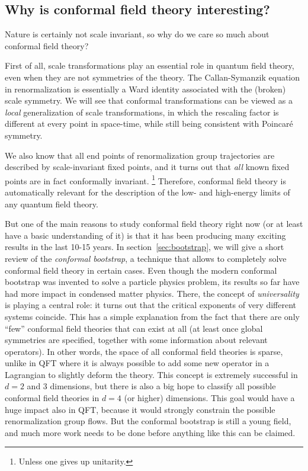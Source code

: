 \documentclass[a4paper,12pt]{article}
\numberwithin{equation}{section}
\begin{document}
\subsection{Why is conformal field theory interesting?}

Nature is certainly not scale invariant, so why do we care so much about conformal field theory?

First of all, scale transformations play an essential role in quantum field theory, even when they are not symmetries of the theory. The Callan-Symanzik equation in renormalization is essentially a Ward identity associated with the (broken) scale symmetry. 
We will see that conformal transformations can be viewed as a \emph{local} generalization of scale transformations, in which the rescaling factor is different at every point in space-time, while still being consistent with Poincaré symmetry.

We also know that all end points of renormalization group trajectories are described by scale-invariant fixed points, and it turns out that \emph{all} known fixed points are in fact conformally invariant.%
%
\footnote{Unless one gives up unitarity.}
%
Therefore, conformal field theory is automatically relevant for the description of the low- and high-energy limits of any quantum field theory.

But one of the main reasons to study conformal field theory right now (or at least have a basic understanding of it) is that it has been producing many exciting results in the last 10-15 years. In section~\ref{sec:bootstrap}, we will give a short review of the  \emph{conformal bootstrap}, a technique that allows to completely solve conformal field theory in certain cases.
Even though the modern conformal bootstrap was invented to solve a particle physics problem, its results so far have had more impact in condensed matter physics. There, the concept of \emph{universality} is playing a central role: it turns out that the critical exponents of very different systems coincide. This has a simple explanation from the fact that there are only ``few'' conformal field theories that can exist at all (at least once global symmetries are specified, together with some information about relevant operators). In other words, the space of all conformal field theories is sparse, unlike in QFT where it is always possible to add some new operator in a Lagrangian to slightly deform the theory.
This concept is extremely successful in $d = 2$ and 3 dimensions, but there is also a big hope to classify all possible conformal field theories in $d = 4$ (or higher) dimensions. 
This goal would have a huge impact also in QFT, because it would strongly constrain the possible renormalization group flows.
But the conformal bootstrap is still a young field, and much more work needs to be done before anything like this can be claimed.
\end{document}
